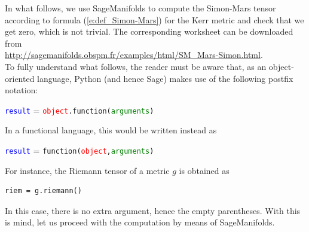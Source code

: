\documentclass[a4paper]{jpconf}
\newcommand{\soft}[1]{\textsf{#1}}
\newcommand{\Sage}{\soft{Sage}}
\newcommand{\SM}{\soft{SageManifolds}}
\begin{document}
In what follows, we use \SM{} to compute the Simon-Mars tensor 
according to formula (\ref{e:def_Simon-Mars}) for the Kerr metric and check 
that we get zero, which is not trivial. 
The corresponding worksheet can be downloaded from \\
\url{http://sagemanifolds.obspm.fr/examples/html/SM_Mars-Simon.html}.\\
To fully understand what follows, the reader must be aware that, 
as an object-oriented language, Python (and hence \Sage{}) makes use of 
the following postfix notation:
\begin{center}
\textcolor{blue}{\texttt{result}} = \textcolor{red}{\texttt{object}}\texttt{.}\texttt{function(}\textcolor{green}{\texttt{arguments}}\texttt{)}
\end{center}
In a functional language, this would be written instead as
 \begin{center}
\textcolor{blue}{\texttt{result}} = \texttt{function(}\textcolor{red}{\texttt{object}}\texttt{,}\textcolor{green}{\texttt{arguments}}\texttt{)}
\end{center}
For instance, the Riemann tensor of a metric $g$ is obtained as 
\begin{verbatim}
riem = g.riemann()
\end{verbatim}
In this case, there is no extra argument, hence the empty parentheses. 
With this is mind, let us proceed with the computation by means of 
\SM{}. 
\end{document}
